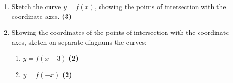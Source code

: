 \documentclass[a4paper,12pt]{article}
\begin{document}
\begin{tcolorbox}
\begin{enumerate}[label=(\alph*)] 
\item Sketch the curve \( y = f(x) \), showing the points of intersection with the coordinate axes. \hfill \textbf{(3)} 
\vfill %

\item Showing the coordinates of the points of intersection with the coordinate axes, sketch on separate diagrams the curves:
    \begin{enumerate}[label=(\roman*)]
    \item \( y = f(x - 3) \) \hfill \textbf{(2)} 
    \vfill 
    \item \( y = f(-x) \) \hfill \textbf{(2)} 
    \vfill
    \end{enumerate}
\end{enumerate}

\end{tcolorbox} %
\end{document}
